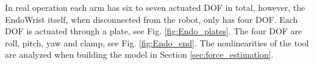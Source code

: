 In real operation each arm has six to seven actuated DOF in total, however, the EndoWrist itself, when disconnected from the robot, only has four DOF. Each DOF is actuated through a plate, see Fig. \ref{fig:Endo_plates}. The four DOF are roll, pitch, yaw and clamp, see Fig. \ref{fig:Endo_end}. The nonlinearities of the tool are analyzed when building the model in Section \ref{sec:force_estimation}.











